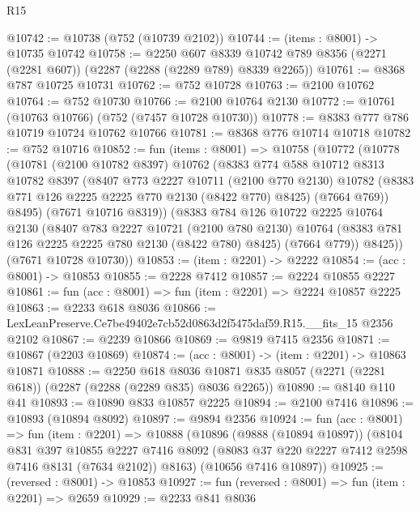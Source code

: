 \begin{lexlean}{R15}
\begin{coremodule}
@10742 := @10738 (@752 (@10739 @2102))
@10744 := (items : @8001) -> @10735 @10742
@10758 := @2250
    @607
    @8339
    @10742
    @789
    @8356
    (@2271 (@2281 @607))
    (@2287 (@2288 (@2289 @789) @8339 @2265))
@10761 := @8368 @787 @10725 @10731
@10762 := @752 @10728
@10763 := @2100 @10762
@10764 := @752 @10730
@10766 := @2100 @10764 @2130
@10772 := @10761 (@10763 @10766) (@752 (@7457 @10728 @10730))
@10778 := @8383 @777 @786 @10719 @10724 @10762 @10766
@10781 := @8368 @776 @10714 @10718
@10782 := @752 @10716
@10852 := fun (items : @8001) =>
  @10758
    (@10772
      (@10778
        (@10781
          (@2100 @10782 @8397)
          @10762
          (@8383
            @774
            @588
            @10712
            @8313
            @10782
            @8397
            (@8407
              @773
              @2227
              @10711
              (@2100 @770 @2130)
              @10782
              (@8383 @771 @126 @2225 @2225 @770 @2130 (@8422 @770) @8425)
              (@7664 @769))
            @8495)
          (@7671 @10716 @8319))
        (@8383
          @784
          @126
          @10722
          @2225
          @10764
          @2130
          (@8407
            @783
            @2227
            @10721
            (@2100 @780 @2130)
            @10764
            (@8383 @781 @126 @2225 @2225 @780 @2130 (@8422 @780) @8425)
            (@7664 @779))
          @8425))
      (@7671 @10728 @10730))
@10853 := (item : @2201) -> @2222
@10854 := (acc : @8001) -> @10853
@10855 := @2228 @7412
@10857 := @2224 @10855 @2227
@10861 := fun (acc : @8001) => fun (item : @2201) => @2224 @10857 @2225
@10863 := @2233 @618 @8036
@10866 := LexLeanPreserve.Ce7be49402e7cb52d0863d2f5475daf59.R15.__fits_15 @2356 @2102
@10867 := @2239 @10866
@10869 := @9819 @7415 @2356
@10871 := @10867 (@2203 @10869)
@10874 := (acc : @8001) -> (item : @2201) -> @10863 @10871
@10888 := @2250
    @618
    @8036
    @10871
    @835
    @8057
    (@2271 (@2281 @618))
    (@2287 (@2288 (@2289 @835) @8036 @2265))
@10890 := @8140 @110 @41
@10893 := @10890 @833 @10857 @2225
@10894 := @2100 @7416
@10896 := @10893 (@10894 @8092)
@10897 := @9894 @2356
@10924 := fun (acc : @8001) =>
  fun (item : @2201) =>
  @10888
    (@10896
      (@9888 (@10894 @10897))
      (@8104
        @831
        @397
        @10855
        @2227
        @7416
        @8092
        (@8083 @37 @220 @2227 @7412 @2598 @7416 @8131 (@7634 @2102))
        @8163)
      (@10656 @7416 @10897))
@10925 := (reversed : @8001) -> @10853
@10927 := fun (reversed : @8001) => fun (item : @2201) => @2659
@10929 := @2233 @841 @8036

\end{coremodule}
\end{lexlean}
